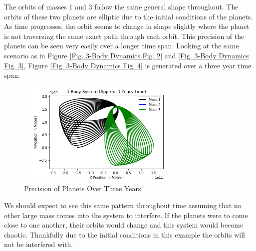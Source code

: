\documentclass[twocolumn]{article}
\begin{document}
\par \noindent
The orbits of masses 1 and 3 follow the same general shape throughout. The orbits of these two planets are elliptic due to the initial conditions of the planets. As time progresses, the orbit seems to change in shape slightly where the planet is not traversing the same exact path through each orbit.  This precision of the planets can be seen very easily over a longer time span. Looking at the same scenario as in Figure \ref{Fig. 3-Body Dynamics Fig. 2} and \ref{Fig. 3-Body Dynamics Fig. 3}, Figure \ref{Fig. 3-Body Dynamics Fig. 4} is generated over a three year time span.
\newpage
\begin{figure}[ht]
    \centering
    \includegraphics[width=8cm, height=5cm]{Figures/3-Body Dynamics (5).png}
    \caption{Precision of Planets Over Three Years.}
    \label{Fig. 3-Body Dynamics Fig. 5}
\end{figure}
\par \noindent
We should expect to see this same pattern throughout time assuming that no other large mass comes into the system to interfere. If the planets were to come close to one another, their orbits would change and this system would become chaotic. Thankfully due to the initial conditions in this example the orbits will not be interfered with.
\end{document}
